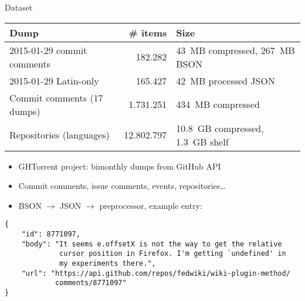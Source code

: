 \documentclass[t,11pt]{beamer}
\begin{document}
\begin{frame}[fragile]{Dataset}
\vspace*{-26pt}
\begin{table}[h]
  \centering
  {\setlength{\tabcolsep}{3pt}\footnotesize
  \begin{tabular}{|l|r|l|} \hline
    Dump                       &   \# items & Size \\ \hline
    2015-01-29 commit comments &    182.282 & 43~MB compressed, 267~MB BSON
    \\ \hline
    2015-01-29 Latin-only      &    165.427 & 42~MB processed JSON \\ \hline
    Commit comments (17 dumps) &  1.731.251 & 434~MB compressed \\ \hline
    Repositories (languages)   & 12.802.797 & 10.8~GB compressed, 1.3~GB shelf 
    \\ \hline
  \end{tabular}}
\end{table}
\begin{itemize}
  \item GHTorrent project: bimonthly dumps from GitHub API
  \item Commit comments, issue comments, events, repositories\ldots
  \item BSON $\to$ JSON $\to$ preprocessor, example entry:
\end{itemize}
{\scriptsize\begin{verbatim}
{
    "id": 8771097,
    "body": "It seems e.offsetX is not the way to get the relative
             cursor position in Firefox. I'm getting `undefined' in
             my experiments there.",
    "url": "https://api.github.com/repos/fedwiki/wiki-plugin-method/
            comments/8771097"
}
\end{verbatim}}
\end{frame}
\end{document}
